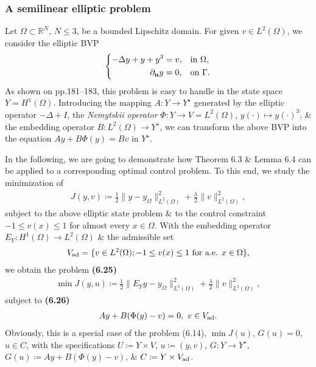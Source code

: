 \documentclass[oneside]{book}
\numberwithin{equation}{section}
\begin{document}
\subsubsection{A semilinear elliptic problem}
Let $\Omega\subset\mathbb{R}^N$, $N\le 3$, be a bounded Lipschitz domain. For given $v\in L^2(\Omega)$, we consider the elliptic BVP
\begin{equation*}
	\left\{\begin{split}
		-\Delta y + y + y^3 &= v,&&\mbox{in }\Omega,\\
		\partial_{\bf n}y &= 0,&&\mbox{on }\Gamma.
	\end{split}\right.
\end{equation*}
As shown on pp.181--183, this problem is easy to handle in the state space $Y = H^1(\Omega)$. Introducing the mapping $A:Y\to Y^\star$ generated by the elliptic operator $-\Delta + I$, the \textit{Nemytskii operator} $\Phi:Y\to V = L^2(\Omega)$, $y(\cdot)\mapsto y(\cdot)^3$, \& the embedding operator $B:L^2(\Omega)\to Y^\star$, we can transform the above BVP into the equation $Ay + B\Phi(y) = Bv$ in $Y^\star$.

In the following, we are going to demonstrate how Theorem 6.3 \& Lemma 6.4 can be applied to a corresponding optimal control problem. To this end, we study the minimization of
\begin{align*}
	J(y,v)\coloneqq\frac{1}{2}\|y - y_\Omega\|_{L^2(\Omega)}^2 + \frac{\lambda}{2}\|v\|_{L^2(\Omega)}^2,
\end{align*}
subject to the above elliptic state problem \& to the control constraint $-1\le v(x)\le 1$ for almost every $x\in\Omega$. With the embedding operator $E_Y:H^1(\Omega)\to L^2(\Omega)$ \& the admissible set
\begin{align*}
	V_{\rm ad} = \{v\in L^2(\Omega);-1\le v(x)\le 1\mbox{ for a.e. } x\in\Omega\},
\end{align*}
we obtain the problem \textbf{(6.25)}
\begin{align*}
	\min J(y,u)\coloneqq\frac{1}{2}\|E_Yy - y_\Omega\|_{L^2(\Omega)}^2 + \frac{\lambda}{2}\|v\|_{L^2(\Omega)}^2,
\end{align*}
subject to \textbf{(6.26)}
\begin{align*}
	Ay + B(\Phi(y) - v) = 0,\ v\in V_{\rm ad}.
\end{align*}
Obviously, this is a special case of the problem (6.14), $\min J(u)$, $G(u) = 0$, $u\in C$, with the specifications $U\coloneqq Y\times V$, $u\coloneqq(y,v)$, $G:Y\to Y^\star$, $G(u)\coloneqq Ay + B(\Phi(y) - v)$, \& $C\coloneqq Y\times V_{\rm ad}$.
\end{document}
